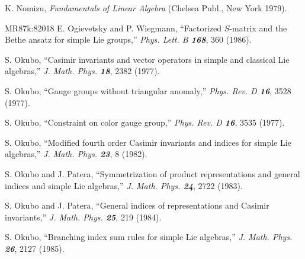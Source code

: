  K. Nomizu, %
    {\em Fundamentals of Linear Algebra}
    (Chelsea Publ., New York 1979).



        {MR87k:82018}
E. Ogievetsky and P. Wiegmann,
``Factorized $S$-matrix and the Bethe
  ansatz for simple Lie groups,''
{\em Phys. Lett. B  \bf 168}, 360 (1986). %

S. Okubo,
``Casimir invariants and vector operators in simple
and classical Lie algebras,''
{\em J. Math. Phys. \bf 18}, 2382 (1977). %

S. Okubo,
``Gauge groups without triangular anomaly,''
{\em Phys.  Rev.    D \bf 16}, 3528 (1977).

S. Okubo,
``Constraint on color gauge group,''
{\em Phys. Rev. D \bf 16}, 3535 (1977).


S. Okubo,
``Modified fourth order Casimir invariants and indices for simple Lie algebras,''
{\em J.  Math.  Phys.    \bf 23}, 8 (1982).

S. Okubo and J. Patera,
``Symmetrization of product representations and general indices and simple
Lie algebras,''
{\em J.  Math.  Phys.    \bf 24}, 2722 (1983).

S. Okubo and J. Patera,
``General indices of representations and Casimir invariants,''
{\em J.  Math.  Phys.    \bf 25}, 219 (1984).

S. Okubo,
``Branching index sum rules for simple Lie algebras,''
{\em J. Math. Phys.  \bf 26}, 2127 (1985).

